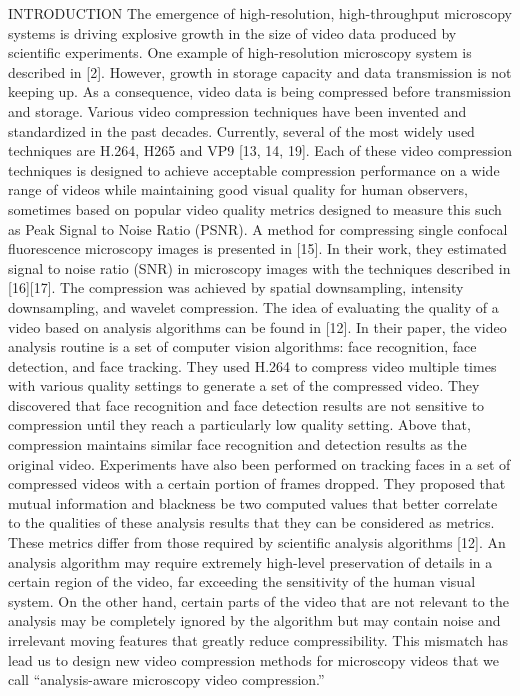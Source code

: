 INTRODUCTION
The emergence of high-resolution, high-throughput microscopy systems is driving explosive growth in the size of video data produced by scientific experiments. One example of high-resolution microscopy system is described in [2]. However, growth in storage capacity and data transmission is not keeping up. As a consequence, video data is being compressed before transmission and storage.
Various video compression techniques have been invented and standardized in the past decades. Currently, several of the most widely used techniques are H.264, H265 and VP9 [13, 14, 19]. Each of these video compression techniques is designed to achieve acceptable compression performance on a wide range of videos while maintaining good visual quality for human observers, sometimes based on popular video quality metrics designed to measure this such as Peak Signal to Noise Ratio (PSNR).
A method for compressing single confocal fluorescence microscopy images is presented in [15]. In their work, they estimated signal to noise ratio (SNR) in microscopy images with the techniques described in [16][17]. The compression was achieved by spatial downsampling, intensity downsampling, and wavelet compression.
The idea of evaluating the quality of a video based on analysis algorithms can be found in [12]. In their paper, the video analysis routine is a set of computer vision algorithms: face recognition, face detection, and face tracking. They used H.264 to compress video multiple times with various quality settings to generate a set of the compressed video. They discovered that face recognition and face detection results are not sensitive to compression until they reach a particularly low quality setting. Above that, compression maintains similar face recognition and detection results as the original video. Experiments have also been performed on tracking faces in a set of compressed videos with a certain portion of frames dropped. They proposed that mutual information and blackness be two computed values that better correlate to the qualities of these analysis results that they can be considered as metrics.
These metrics differ from those required by scientific analysis algorithms [12]. An analysis algorithm may require extremely high-level preservation of details in a certain region of the video, far exceeding the sensitivity of the human visual system. On the other hand, certain parts of the video that are not relevant to the analysis may be completely ignored by the algorithm but may contain noise and irrelevant moving features that greatly reduce compressibility. This mismatch has lead us to design new video compression methods for microscopy videos that we call “analysis-aware microscopy video compression.”
